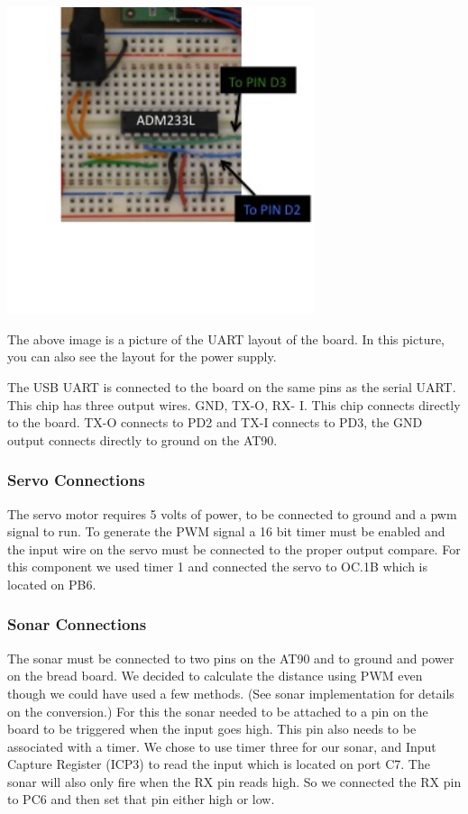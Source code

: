   \begin{center}
    \includegraphics[width=90mm]{imageSources/uartConnect3.png}
  \end{center}
  \label{uartConnect3}


The above image is a picture of the UART layout of the board. In this picture, you can also see the layout for the power supply.

The USB UART is connected to the board on the same pins as the serial UART.  This chip has three output wires.  GND, TX-O, RX- I. This chip connects directly to the board. TX-O connects to PD2 and TX-I connects to PD3, the GND output connects directly to ground on the AT90.

\subsubsection{Servo Connections}
The servo motor requires 5 volts of power, to be connected to ground and a pwm signal to run. To generate the PWM signal a 16 bit timer must be enabled and the input wire on the servo must be connected to the proper output compare. For this component we used timer 1 and connected the servo to OC.1B which is located on PB6.

\subsubsection{Sonar Connections}
The sonar must be connected to two pins on the AT90 and to ground and power on the bread board. We decided to calculate the distance using PWM even though we could have used a few methods. (See sonar implementation for details on the conversion.)  For this the sonar needed to be attached to a pin on the board to be triggered when the input goes high. This pin also needs to be associated with a timer. We chose to use timer three for our sonar, and Input Capture Register (ICP3) to read the input which is located on port C7. The sonar will also only fire when the RX pin reads high. So we connected the RX pin to PC6 and then set that pin either high or low.

